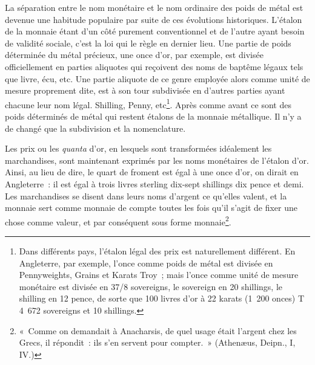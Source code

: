 \documentclass[french,twoside]{book} %
\begin{document}
\noindent La séparation entre le nom monétaire et le nom ordinaire des poids de métal est devenue une habitude populaire par suite de ces évolutions historiques. L’étalon de la monnaie étant d’un côté purement conventionnel et de l’autre ayant besoin de validité sociale, c’est la loi qui le règle en dernier lieu. Une partie de poids déterminée du métal précieux, une once d’or, par exemple, est divisée officiellement en parties aliquotes qui reçoivent des noms de baptême légaux tels que livre, écu, etc. Une partie aliquote de ce genre employée alors comme unité de mesure proprement dite, est à son tour subdivisée en d’autres parties ayant chacune leur nom légal. Shilling, Penny, etc\footnote{Dans différents pays, l’étalon légal des prix est naturellement différent. En Angleterre, par exemple, l’once comme poids de métal est divisée en Pennyweights, Grains et Karats Troy ; mais l’once comme unité de mesure monétaire est divisée en 37/8 sovereigns, le sovereign en 20 shillings, le shilling en 12 pence, de sorte que 100 livres d’or à 22 karats (1 200 onces) T 4 672 sovereigns et 10 shillings.}. Après comme avant ce sont des poids déterminés de métal qui restent étalons de la monnaie métallique. Il n’y a de changé que la subdivision et la nomenclature.\par
Les prix ou les \emph{quanta} d’or, en lesquels sont transformées idéalement les marchandises, sont maintenant exprimés par les noms monétaires de l’étalon d’or. Ainsi, au lieu de dire, le quart de froment est égal à une once d’or, on dirait en Angleterre : il est égal à trois livres sterling dix‑sept shillings dix pence et demi. Les marchandises se disent dans leurs noms d’argent ce qu’elles valent, et la monnaie sert comme monnaie de compte toutes les fois qu’il s’agit de fixer une chose comme valeur, et par conséquent sous forme monnaie\footnote{« Comme on demandait à Anacharsis, de quel usage était l’argent chez les Grecs, il répondit : ils s’en servent pour compter. » (Athenæus, Deipn., I, IV.)}.\par
\end{document}
